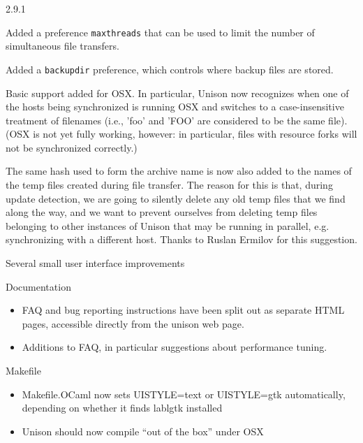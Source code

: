 \begin{changesfromversion}{2.9.1}
\item Added a preference {\tt maxthreads} that can be used to limit the
number of simultaneous file transfers.
\item Added a {\tt backupdir} preference, which controls where backup
files are stored.
\item Basic support added for OSX.  In particular, Unison now recognizes
when one of the hosts being synchronized is running OSX and switches to
a case-insensitive treatment of filenames (i.e., 'foo' and 'FOO' are
considered to be the same file).
  (OSX is not yet fully working,
  however: in particular, files with resource forks will not be
  synchronized correctly.)
\item The same hash used to form the archive name is now also added to
the names of the temp files created during file transfer.  The reason for
this is that, during update detection, we are going to silently delete
any old temp files that we find along the way, and we want to prevent
ourselves from deleting temp files belonging to other instances of Unison
that may be running in parallel, e.g. synchronizing with a different
host.  Thanks to Ruslan Ermilov for this suggestion.
\item Several small user interface improvements
\item Documentation
\begin{itemize}
\item FAQ and bug reporting instructions have been split out as separate
      HTML pages, accessible directly from the unison web page.
\item Additions to FAQ, in particular suggestions about performance
tuning.
\end{itemize}
\item Makefile
\begin{itemize}
\item Makefile.OCaml now sets UISTYLE=text or UISTYLE=gtk automatically,
  depending on whether it finds lablgtk installed
\item Unison should now compile ``out of the box'' under OSX
\end{itemize}
\end{changesfromversion}


